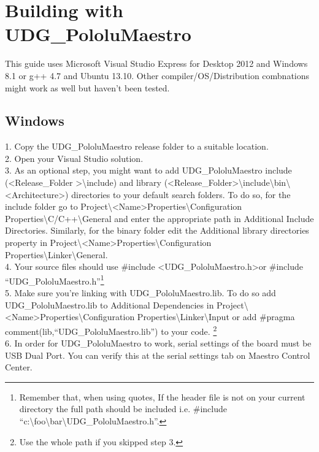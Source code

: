 \documentclass[letterpaper]{book}
\begin{document}
\section{Building with UDG\_PololuMaestro}
This guide uses Microsoft Visual Studio Express for Desktop 2012 and Windows 8.1 or g++ 4.7 and Ubuntu 13.10. Other compiler/OS/Distribution combnations might work as well but haven't been tested.\\
\subsection{Windows}
1. Copy the UDG\_PololuMaestro release folder to a suitable location.\\
2. Open your Visual Studio solution.\\
3. As an optional step, you might want to add UDG\_PololuMaestro include (\textless{}Release\_Folder \textgreater\textbackslash{include}) and library (\textless{}Release\_Folder\textgreater\textbackslash{include}\textbackslash{bin}\textbackslash{\textless{}Architecture\textgreater}) directories to your default search folders. To do so, for the include folder go to Project\textbackslash{\textless{}Name\textgreater Properties}\textbackslash{Configuration Properties}\textbackslash{C/C++}\textbackslash{General} and enter the appropriate path in Additional Include Directories. Similarly, for the binary folder edit the Additional library directories property in  Project\textbackslash{\textless{}Name\textgreater{}Properties}\textbackslash{Configuration Properties}\textbackslash{Linker}\textbackslash{General}.\\
4. Your source files should use \#include \textless UDG\_PololuMaestro.h\textgreater or \#include ``UDG\_PololuMaestro.h''\footnote{Remember that, when using quotes, If the header file is not on your current directory the full path should be included i.e. \#include ``c:\textbackslash{}foo\textbackslash{}bar\textbackslash{}UDG\_PololuMaestro.h''.}\\
5. Make sure you're linking with UDG\_PololuMaestro.lib. To do so add UDG\_PololuMaestro.lib to Additional Dependencies in Project\textbackslash{\textless{}Name\textgreater{}Properties}\textbackslash{Configuration Properties}\textbackslash{Linker}\textbackslash{Input} or add \#pragma comment(lib,``UDG\_PololuMaestro.lib'') to your code. \footnote{Use the whole path if you skipped step 3.}\\
6. In order for UDG\_PololuMaestro to work, serial settings of the board must be USB Dual Port. You can verify this at the serial settings tab on Maestro Control Center.\\
\end{document}
